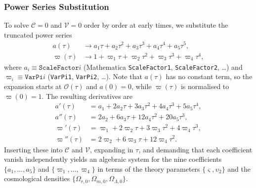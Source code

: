 \documentclass{article}
\newcommand{\Mp}{M_{\mathrm{P}}}
\newcommand{\rhom}{\rho_m}
\newcommand{\rhor}{\rho_r}
\newcommand{\rhoL}{\rho_\Lambda}
\begin{document}
\subsubsection{Power Series Substitution}

To solve $\mathcal{C} = 0$ and $\mathcal{V} = 0$ order by order at early times, we substitute the truncated power series
\begin{align}
a(\tau) &\to a_1 \tau + a_2 \tau^2 + a_3 \tau^3 + a_4 \tau^4 + a_5 \tau^5, \\
\varpi(\tau) &\to 1 + \varpi_1 \tau + \varpi_2 \tau^2 + \varpi_3 \tau^3 + \varpi_4 \tau^4,
\end{align}
where $a_i \equiv \texttt{ScaleFactor}i$ (Mathematica \texttt{ScaleFactor1}, \texttt{ScaleFactor2}, \dots) and $\varpi_i \equiv \texttt{VarPi}i$ (\texttt{VarPi1}, \texttt{VarPi2}, \dots). Note that $a(\tau)$ has no constant term, so the expansion starts at $\mathcal{O}(\tau)$ and $a(0) = 0$, while $\varpi(\tau)$ is normalised to $\varpi(0) = 1$. The resulting derivatives are
\begin{align}
a'(\tau) &= a_1 + 2 a_2 \tau + 3 a_3 \tau^2 + 4 a_4 \tau^3 + 5 a_5 \tau^4, \\
a''(\tau) &= 2 a_2 + 6 a_3 \tau + 12 a_4 \tau^2 + 20 a_5 \tau^3, \\
\varpi'(\tau) &= \varpi_1 + 2 \varpi_2 \tau + 3 \varpi_3 \tau^2 + 4 \varpi_4 \tau^3, \\
\varpi''(\tau) &= 2 \varpi_2 + 6 \varpi_3 \tau + 12 \varpi_4 \tau^2 .
\end{align}
Inserting these into $\mathcal{C}$ and $\mathcal{V}$, expanding in $\tau$, and demanding that each coefficient vanish independently yields an algebraic system for the nine coefficients $\{a_1, \ldots, a_5\}$ and $\{\varpi_1, \ldots, \varpi_4\}$ in terms of the theory parameters $\{\varsigma, \upsilon_2\}$ and the cosmological densities $\{\Omega_{r,0}, \Omega_{m,0}, \Omega_{\Lambda,0}\}$.



\end{document}
